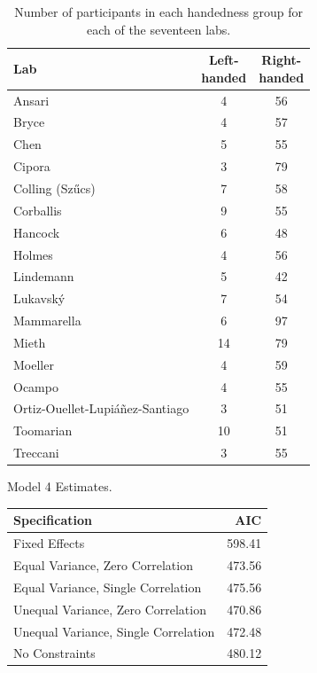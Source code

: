 \documentclass[man,floatsintext]{apa6}
\theoremstyle{definition}
\theoremstyle{definition}
\theoremstyle{definition}
\theoremstyle{remark}
\begin{document}
\begin{appendix}
\begin{table}

\caption{\label{tab:hand}Number of participants in each handedness group for each of the seventeen labs.}
\centering
\begin{tabular}[t]{lcc}
\toprule
Lab & \makecell[c]{Left-\\handed} & \makecell[c]{Right-\\handed}\\
\midrule
Ansari & 4 & 56\\
Bryce & 4 & 57\\
Chen & 5 & 55\\
Cipora & 3 & 79\\
Colling (Szűcs) & 7 & 58\\
Corballis & 9 & 55\\
Hancock & 6 & 48\\
Holmes & 4 & 56\\
Lindemann & 5 & 42\\
Lukavský & 7 & 54\\
Mammarella & 6 & 97\\
Mieth & 14 & 79\\
Moeller & 4 & 59\\
Ocampo & 4 & 55\\
Ortiz-Ouellet-Lupiáñez-Santiago & 3 & 51\\
Toomarian & 10 & 51\\
Treccani & 3 & 55\\
\bottomrule
\end{tabular}
\end{table}

\begin{table}[!p]
\caption{\label{tab:mod4}Model 4 Estimates.}
\begin{subtable}{\textwidth}
\centering
\begin{table}[H]\centering\begingroup\fontsize{10}{12}\selectfont

\begin{tabular}{lr}
\toprule
Specification & AIC\\
\midrule
Fixed Effects & 598.41\\
Equal Variance, Zero Correlation & 473.56\\
Equal Variance, Single Correlation & 475.56\\
Unequal Variance, Zero Correlation & 470.86\\
Unequal Variance, Single Correlation & 472.48\\
No Constraints & 480.12\\
\bottomrule
\end{tabular}\endgroup{}
\end{table}
\end{subtable}
\begin{subtable}{\textwidth}
\caption{Fixed Effect Estimates}
\centering
\begin{table}[H]\centering\begingroup\fontsize{10}{12}\selectfont


\end{table}
\end{subtable}
\end{table}
\end{appendix}
\end{document}
